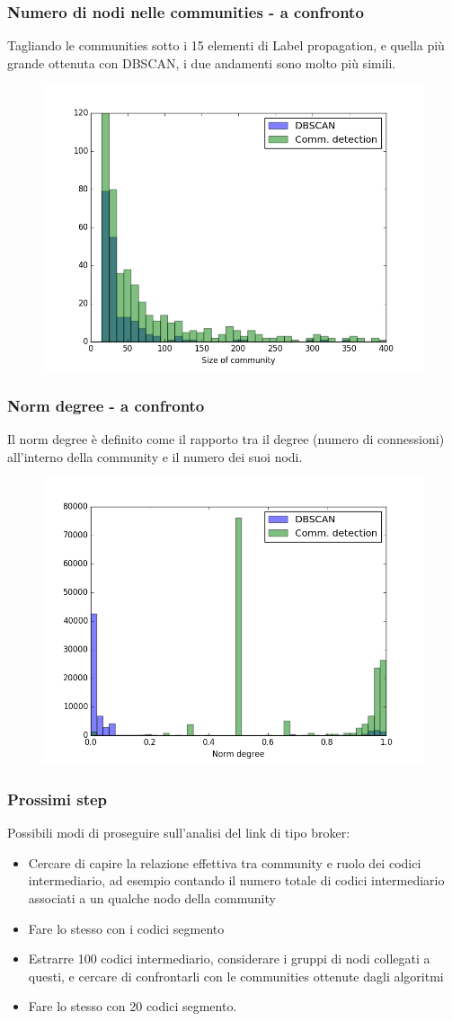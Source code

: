 \documentclass{beamer}
\begin{document}
\begin{frame}
 \frametitle{Numero di nodi nelle communities - a confronto}
 Tagliando le communities sotto i 15 elementi di Label propagation, e quella più grande ottenuta con DBSCAN, i due andamenti sono molto più simili.
  \begin{figure}[htbp]
\centering
\includegraphics[height=6.0 cm,width=10 cm]{plot_nnodes.png}

\end{figure}
\end{frame}
\begin{frame}
 \frametitle{Norm degree - a confronto}
 Il norm degree è definito come il rapporto tra il degree (numero di connessioni) all'interno della community e il numero dei suoi nodi.
  \begin{figure}[htbp]
\centering
\includegraphics[height=6.0 cm,width=10 cm]{plot_ndegree.png}

\end{figure}
\end{frame}
\begin{frame}
\frametitle{Prossimi step}
Possibili modi di proseguire sull'analisi del link di tipo broker:
\begin{itemize}
\item Cercare di capire la relazione effettiva tra community e ruolo dei codici intermediario, ad esempio contando il numero totale di codici intermediario associati a un qualche nodo della community
\item Fare lo stesso con i codici segmento
\item Estrarre 100 codici intermediario, considerare i gruppi di nodi collegati a questi, e cercare di confrontarli con le communities ottenute dagli algoritmi
\item Fare lo stesso con 20 codici segmento.
\end{itemize}
\end{frame}
\end{document}
